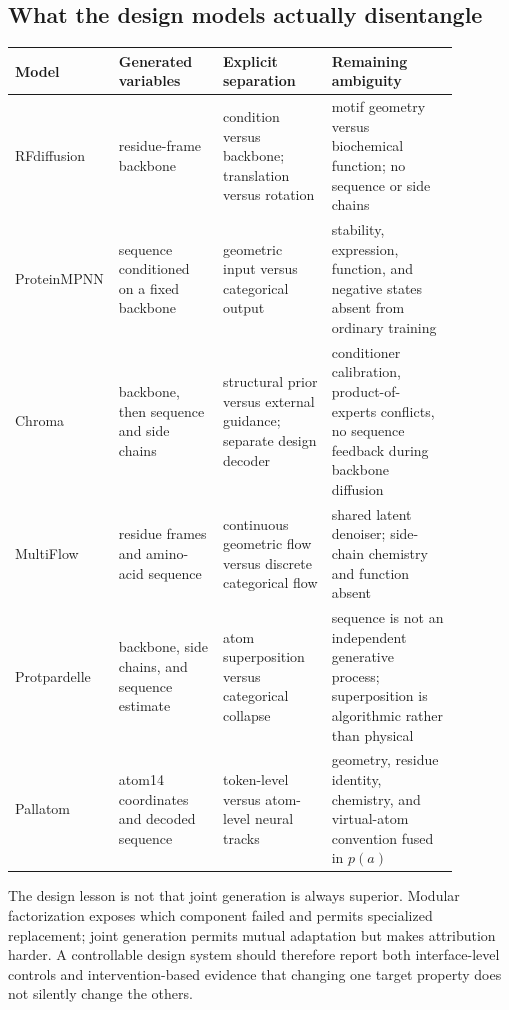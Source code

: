 \documentclass[10pt]{article}
\begin{document}
\subsection{What the design models actually disentangle}

\begin{center}
\scriptsize
\begin{tabular}{>{\raggedright\arraybackslash}p{0.12\linewidth}
                >{\raggedright\arraybackslash}p{0.23\linewidth}
                >{\raggedright\arraybackslash}p{0.24\linewidth}
                >{\raggedright\arraybackslash}p{0.29\linewidth}}
\toprule
Model & Generated variables & Explicit separation & Remaining ambiguity \\
\midrule
RFdiffusion & residue-frame backbone & condition versus backbone; translation versus rotation & motif geometry versus biochemical function; no sequence or side chains \\
ProteinMPNN & sequence conditioned on a fixed backbone & geometric input versus categorical output & stability, expression, function, and negative states absent from ordinary training \\
Chroma & backbone, then sequence and side chains & structural prior versus external guidance; separate design decoder & conditioner calibration, product-of-experts conflicts, no sequence feedback during backbone diffusion \\
MultiFlow & residue frames and amino-acid sequence & continuous geometric flow versus discrete categorical flow & shared latent denoiser; side-chain chemistry and function absent \\
Protpardelle & backbone, side chains, and sequence estimate & atom superposition versus categorical collapse & sequence is not an independent generative process; superposition is algorithmic rather than physical \\
Pallatom & atom14 coordinates and decoded sequence & token-level versus atom-level neural tracks & geometry, residue identity, chemistry, and virtual-atom convention fused in $p(a)$ \\
\bottomrule
\end{tabular}
\end{center}

The design lesson is not that joint generation is always superior.  Modular factorization exposes
which component failed and permits specialized replacement; joint generation permits mutual
adaptation but makes attribution harder.  A controllable design system should therefore report
both interface-level controls and intervention-based evidence that changing one target property
does not silently change the others.
\end{document}
